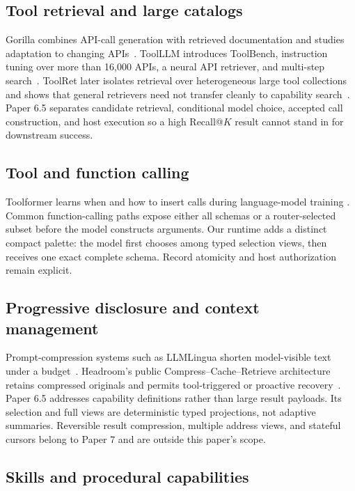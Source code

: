 \documentclass[11pt]{article}
\begin{document}
\subsection{Tool retrieval and large catalogs}

Gorilla combines API-call generation with retrieved documentation and studies
adaptation to changing APIs~\cite{patil2024gorilla}. ToolLLM introduces
ToolBench, instruction tuning over more than 16,000 APIs, a neural API
retriever, and multi-step search~\cite{qin2024toolllm}. ToolRet later isolates
retrieval over heterogeneous large tool collections and shows that general
retrievers need not transfer cleanly to capability search~\cite{shi2025toolret}.
Paper 6.5 separates candidate retrieval, conditional model choice, accepted
call construction, and host execution so a high Recall@$K$ result cannot stand
in for downstream success.

\subsection{Tool and function calling}

Toolformer learns when and how to insert calls during language-model training
\cite{schick2023toolformer}. Common function-calling paths expose either all
schemas or a router-selected subset before the model constructs arguments. Our
runtime adds a distinct compact palette: the model first chooses among typed
selection views, then receives one exact complete schema. Record atomicity and
host authorization remain explicit.

\subsection{Progressive disclosure and context management}

Prompt-compression systems such as LLMLingua shorten model-visible text under a
budget~\cite{jiang2023llmlingua}. Headroom's public Compress--Cache--Retrieve
architecture retains compressed originals and permits tool-triggered or
proactive recovery~\cite{headroom2026ccr}. Paper 6.5 addresses capability
definitions rather than large result payloads. Its selection and full views are
deterministic typed projections, not adaptive summaries. Reversible result
compression, multiple address views, and stateful cursors belong to Paper 7 and
are outside this paper's scope.

\subsection{Skills and procedural capabilities}
\end{document}
